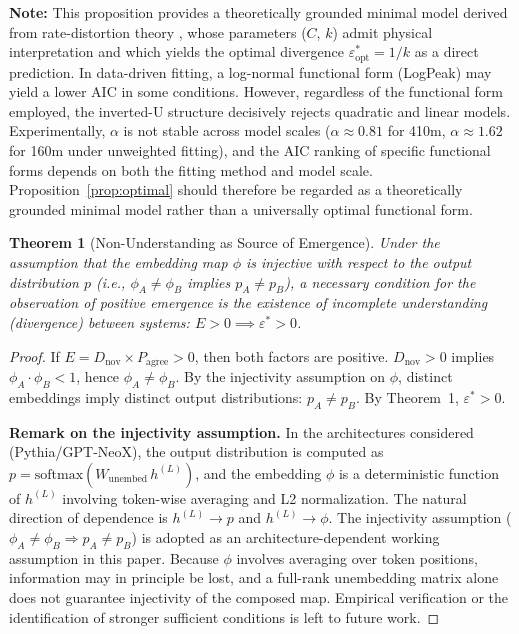 \documentclass[11pt,a4paper]{article}
\newtheorem{theorem}{Theorem}
\begin{document}
\noindent\textbf{Note:} This proposition provides a theoretically grounded minimal model
derived from rate-distortion theory \cite{berger1971}, whose parameters ($C$, $k$) admit
physical interpretation and which yields the optimal divergence
$\varepsilon^*_\mathrm{opt} = 1/k$ as a direct prediction. In data-driven fitting, a
log-normal functional form (LogPeak) may yield a lower AIC in some conditions. However,
regardless of the functional form employed, the inverted-U structure decisively rejects
quadratic and linear models. Experimentally, $\alpha$ is not stable across model scales
($\alpha \approx 0.81$ for 410m, $\alpha \approx 1.62$ for 160m under unweighted fitting),
and the AIC ranking of specific functional forms depends on both the fitting method and
model scale. Proposition~\ref{prop:optimal} should therefore be regarded as a theoretically
grounded minimal model rather than a universally optimal functional form.

\begin{theorem}[Non-Understanding as Source of Emergence]\label{thm:nonunderstanding}
Under the assumption that the embedding map $\phi$ is injective with respect to the output
distribution $p$ (i.e., $\phi_A \neq \phi_B$ implies $p_A \neq p_B$), a necessary condition
for the observation of positive emergence is the existence of incomplete understanding
(divergence) between systems: $E > 0 \implies \varepsilon^* > 0$.
\end{theorem}

\begin{proof}
If $E = D_\mathrm{nov} \times P_\mathrm{agree} > 0$, then both factors are positive.
$D_\mathrm{nov} > 0$ implies $\phi_A \cdot \phi_B < 1$, hence $\phi_A \neq \phi_B$.
By the injectivity assumption on $\phi$, distinct embeddings imply distinct output
distributions: $p_A \neq p_B$. By Theorem~1, $\varepsilon^* > 0$.

\medskip
\noindent\textbf{Remark on the injectivity assumption.}
In the architectures considered (Pythia/GPT-NeoX), the output distribution is computed as
$p = \mathrm{softmax}(W_\mathrm{unembed}\, h^{(L)})$, and the embedding $\phi$ is a
deterministic function of $h^{(L)}$ involving token-wise averaging and L2 normalization.
The natural direction of dependence is $h^{(L)} \to p$ and $h^{(L)} \to \phi$. The injectivity assumption ($\phi_A \neq \phi_B \Rightarrow p_A \neq p_B$) is adopted as an
architecture-dependent working assumption in this paper. Because $\phi$ involves averaging
over token positions, information may in principle be lost, and a full-rank unembedding
matrix alone does not guarantee injectivity of the composed map. Empirical verification or
the identification of stronger sufficient conditions is left to future work.
\end{proof}
\end{document}
